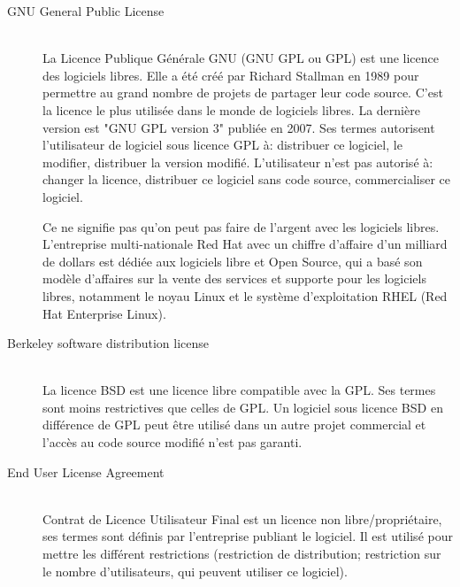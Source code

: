 \begin{description}

\item[GNU General Public License]\hfill \\
La Licence Publique Générale GNU (GNU GPL ou GPL) est une licence des logiciels libres. Elle a été créé par Richard Stallman en 1989 pour permettre au grand nombre de projets de partager leur code source. C'est la licence le plus utilisée dans le monde de logiciels libres. La dernière version est "GNU GPL version 3" publiée en 2007. Ses termes autorisent l'utilisateur de logiciel sous licence GPL à: distribuer ce logiciel, le modifier, distribuer la version modifié. L'utilisateur n'est pas autorisé à: changer la licence, distribuer ce logiciel sans code source, commercialiser ce logiciel.

Ce ne signifie pas qu'on peut pas faire de l'argent avec les logiciels libres. L’entreprise multi-nationale Red Hat avec un chiffre d’affaire d'un milliard de dollars est dédiée aux logiciels libre et Open Source, qui a basé son modèle d'affaires sur la vente des services et supporte pour les logiciels libres, notamment le noyau Linux et le système d'exploitation RHEL (Red Hat Enterprise Linux).

\item[Berkeley software distribution license]\hfill \\
La licence BSD est une licence libre compatible avec la GPL. Ses termes sont moins restrictives que celles de GPL. Un logiciel sous licence BSD en différence de GPL peut être utilisé dans un autre projet commercial et l’accès au code source modifié n'est pas garanti.

\item[End User License Agreement]\hfill \\
Contrat de Licence Utilisateur Final est un licence non libre/propriétaire, ses termes sont définis par l’entreprise publiant le logiciel. Il est utilisé pour mettre les différent restrictions (restriction de distribution; restriction sur le nombre d'utilisateurs, qui peuvent utiliser ce logiciel).
\end{description}
